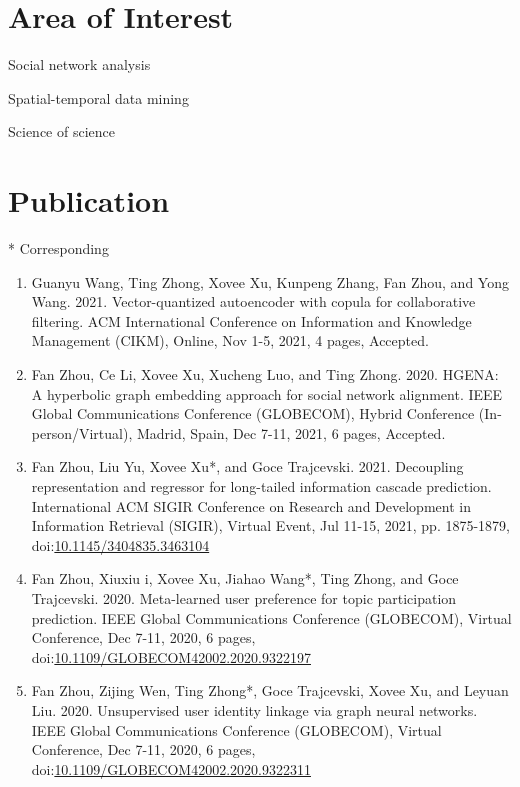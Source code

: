 \section*{Area of Interest}
\indent

Social network analysis

Spatial-temporal data mining

Science of science

\section*{Publication}
\indent

* Corresponding


\begin{enumerate}[resume]
    \item Guanyu Wang, Ting Zhong, Xovee Xu, Kunpeng Zhang, Fan Zhou, and Yong Wang. 2021. Vector-quantized autoencoder with copula for collaborative filtering. ACM International Conference on Information and Knowledge Management (CIKM), Online, Nov 1-5, 2021, 4 pages, Accepted. 
    \item Fan Zhou, Ce Li, Xovee Xu, Xucheng Luo, and Ting Zhong. 2020. HGENA: A hyperbolic graph embedding approach for social network alignment. IEEE Global Communications Conference (GLOBECOM), Hybrid Conference (In-person/Virtual), Madrid, Spain, Dec 7-11, 2021, 6 pages, Accepted. 
    \item Fan Zhou, Liu Yu, Xovee Xu*, and Goce Trajcevski. 2021. Decoupling representation and regressor for long-tailed information cascade prediction. International ACM SIGIR Conference on Research and Development in Information Retrieval (SIGIR), Virtual Event, Jul 11-15, 2021, pp. 1875-1879, doi:\href{https://doi.org/10.1145/3404835.3463104}{10.1145/3404835.3463104}
    \item Fan Zhou, Xiuxiu \swashQ i, Xovee Xu, Jiahao Wang*, Ting Zhong, and Goce Trajcevski. 2020. Meta-learned user preference for topic participation prediction. IEEE Global Communications Conference (GLOBECOM), Virtual Conference, Dec 7-11, 2020, 6 pages, doi:\href{https://doi.org/10.1109/GLOBECOM42002.2020.9322197}{10.1109/GLOBECOM42002.2020.9322197}
    \item Fan Zhou, Zijing Wen, Ting Zhong*, Goce Trajcevski, Xovee Xu, and Leyuan Liu. 2020. Unsupervised user identity linkage via graph neural networks. IEEE Global Communications Conference (GLOBECOM), Virtual Conference, Dec 7-11, 2020, 6 pages, doi:\href{https://doi.org/10.1109/GLOBECOM42002.2020.9322311}{10.1109/GLOBECOM42002.2020.9322311}

\end{enumerate}
